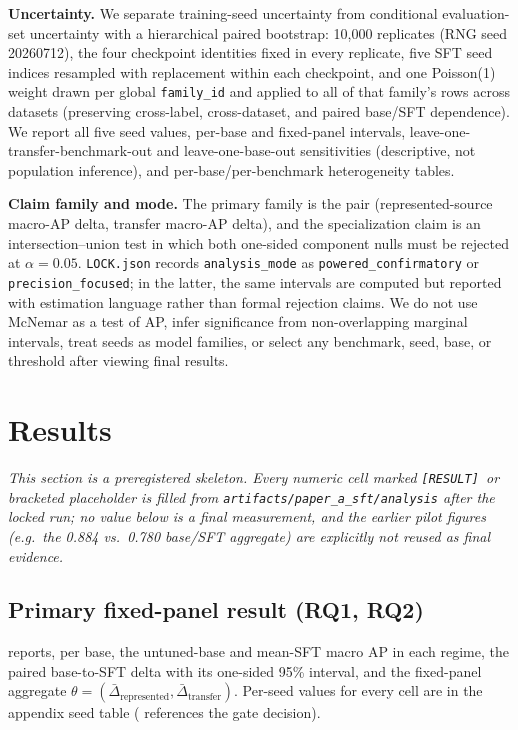 \documentclass[sigconf,nonacm]{acmart}
\newcommand{\RES}{\texttt{[RESULT]}}
\begin{document}
\textbf{Uncertainty.} We separate training-seed uncertainty from conditional evaluation-set uncertainty with a hierarchical paired bootstrap: 10{,}000 replicates (RNG seed 20260712), the four checkpoint identities fixed in every replicate, five SFT seed indices resampled with replacement within each checkpoint, and one Poisson(1) weight drawn per global \texttt{family\_id} and applied to all of that family's rows across datasets (preserving cross-label, cross-dataset, and paired base/SFT dependence). We report all five seed values, per-base and fixed-panel intervals, leave-one-transfer-benchmark-out and leave-one-base-out sensitivities (descriptive, not population inference), and per-base/per-benchmark heterogeneity tables.

\textbf{Claim family and mode.} The primary family is the pair (represented-source macro-AP delta, transfer macro-AP delta), and the specialization claim is an intersection--union test in which both one-sided component nulls must be rejected at $\alpha{=}0.05$. \texttt{LOCK.json} records \texttt{analysis\_mode} as \texttt{powered\_confirmatory} or \texttt{precision\_focused}; in the latter, the same intervals are computed but reported with estimation language rather than formal rejection claims. We do not use McNemar as a test of AP, infer significance from non-overlapping marginal intervals, treat seeds as model families, or select any benchmark, seed, base, or threshold after viewing final results.

\section{Results}
\label{sec:results}

\emph{This section is a preregistered skeleton. Every numeric cell marked \RES\ or bracketed placeholder is filled from \texttt{artifacts/paper\_a\_sft/analysis} after the locked run; no value below is a final measurement, and the earlier pilot figures (e.g.\ the 0.884 vs.\ 0.780 base/SFT aggregate) are explicitly not reused as final evidence.}

\subsection{Primary fixed-panel result (RQ1, RQ2)}
\label{subsec:primary}

 reports, per base, the untuned-base and mean-SFT macro AP in each regime, the paired base-to-SFT delta with its one-sided 95\% interval, and the fixed-panel aggregate $\theta = (\bar\Delta_{\text{represented}}, \bar\Delta_{\text{transfer}})$. Per-seed values for every cell are in the appendix seed table ( references the gate decision).
\end{document}
